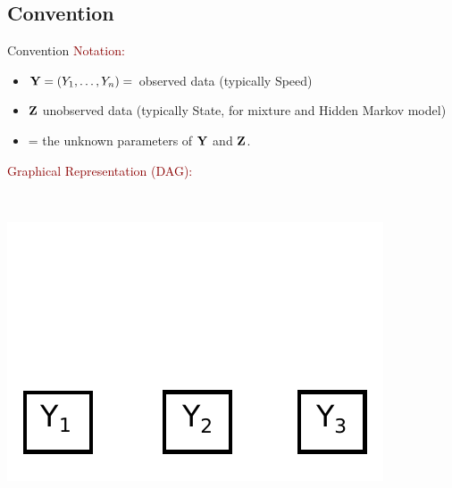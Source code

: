 \documentclass{beamer}\usepackage[]{graphicx}\usepackage[]{color}
\newcommand{\emphase}[1]{\textcolor{darkred}{#1}}
\newcommand{\paragraph}[1]{\emphase{#1}}
\newcommand{\Ybf}{{\bf Y}}
\newcommand{\Zbf}{{\bf Z}}
\newcommand{\thetabf}{\mbox{\mathversion{bold}{$\theta$}}}
\begin{document}
\subsection*{Convention}


\begin{frame}{Convention}
\paragraph{Notation:}
{\small
\begin{itemize}
\item $\Ybf = (Y_1, \ldots, Y_n) = $ observed data (typically Speed)
 \item $\Zbf $ unobserved data (typically State, for mixture  and Hidden Markov model)
 \item \thetabf = the unknown parameters of $\Ybf$ and $\Zbf$.
\end{itemize}
}
\pause
\paragraph{Graphical Representation (DAG):}  \medskip
\begin{columns}
\begin{column}{0.3\textwidth}
\\ \smallskip
\includegraphics[scale=0.4]{Dag1.pdf}
\end{column}
\pause


\end{columns}
\end{frame}
\end{document}
